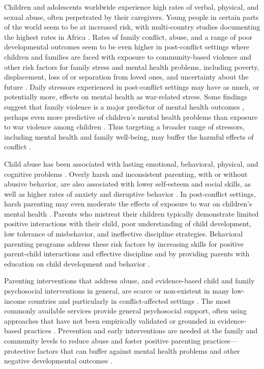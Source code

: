 \documentclass[12pt,authoryear]{elsarticle}\usepackage{knitr}
\begin{document}
Children and adolescents worldwide experience high rates of verbal, physical, and sexual abuse, often perpetrated by their caregivers. Young people in certain parts of the world seem to be at increased risk, with multi-country studies documenting the highest rates in Africa \citep{Akmatov:2011,Stoltenborgh:2011}. Rates of family conflict, abuse, and a range of poor developmental outcomes seem to be even higher in post-conflict settings where children and families are faced with exposure to community-based violence and other risk factors for family stress and mental health problems, including poverty, displacement, loss of or separation from loved ones, and uncertainty about the future \citep{Reed:2012,Mels:2010}. Daily stressors experienced in post-conflict settings may have as much, or potentially more, effects on mental health as war-related stress. Some findings suggest that family violence is a major predictor of mental health outcomes \citep{Panter-Brick:2011,Miller:2010}, perhaps even more predictive of children's mental health problems than exposure to war violence among children \citep{Miller:2010}. Thus targeting a broader range of stressors, including mental health and family well-being, may buffer the harmful effects of conflict \citep{Akinsulure-Smith:2012,Bolton:2004}.

Child abuse has been associated with lasting emotional, behavioral, physical, and cognitive problems \citep{Moylan:2010,Mills:2011,Widom:2012}. Overly harsh and inconsistent parenting, with or without abusive behavior, are also associated with lower self-esteem and social skills, as well as higher rates of anxiety and disruptive behavior \citep{Boudreault-Bouchard:2013,Uji:2014,Yap:2013}. In post-conflict settings, harsh parenting may even moderate the effects of exposure to war on children's mental health \citep{Miller:2010,Catani:2008}. Parents who mistreat their children typically demonstrate limited positive interactions with their child, poor understanding of child development, low tolerance of misbehavior, and ineffective discipline strategies. Behavioral parenting programs address these risk factors by increasing skills for positive parent-child interactions and effective discipline and by providing parents with education on child development and behavior \citep{Kaminski:2008}.

Parenting interventions that address abuse, and evidence-based child and family psychosocial interventions in general, are scarce or non-existent in many low-income countries and particularly in conflict-affected settings \citep{Kakuma:2011,Kieling:2011}. The most commonly available services provide general psychosocial support, often using approaches that have not been empirically validated or grounded in evidence-based practices \citep{Tol:2011}. Prevention and early interventions are needed at the family and community levels to reduce abuse and foster positive parenting practices---protective factors that can buffer against mental health problems and other negative developmental outcomes \citep{Betancourt:2008,Engle:2007,Kieling:2011}. 
\end{document}
